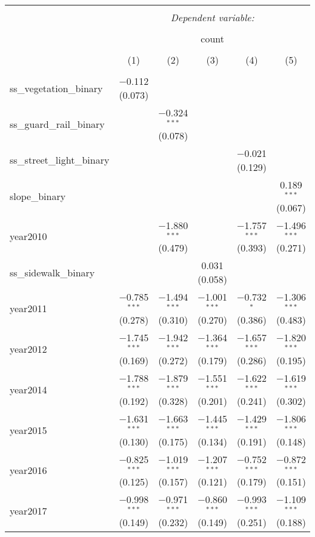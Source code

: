 
\begin{table}[!htbp] \centering 
  \caption{} 
  \label{} 
\small 
\begin{tabular}{@{\extracolsep{1pt}}lccccc} 
\\[-1.8ex]\hline 
\hline \\[-1.8ex] 
 & \multicolumn{5}{c}{\textit{Dependent variable:}} \\ 
\cline{2-6} 
\\[-1.8ex] & \multicolumn{5}{c}{count} \\ 
\\[-1.8ex] & (1) & (2) & (3) & (4) & (5)\\ 
\hline \\[-1.8ex] 
 ss\_vegetation\_binary & $-$0.112 (0.073) &  &  &  &  \\ 
  ss\_guard\_rail\_binary &  & $-$0.324$^{***}$ (0.078) &  &  &  \\ 
  ss\_street\_light\_binary &  &  &  & $-$0.021 (0.129) &  \\ 
  slope\_binary &  &  &  &  & 0.189$^{***}$ (0.067) \\ 
  year2010 &  & $-$1.880$^{***}$ (0.479) &  & $-$1.757$^{***}$ (0.393) & $-$1.496$^{***}$ (0.271) \\ 
  ss\_sidewalk\_binary &  &  & 0.031 (0.058) &  &  \\ 
  year2011 & $-$0.785$^{***}$ (0.278) & $-$1.494$^{***}$ (0.310) & $-$1.001$^{***}$ (0.270) & $-$0.732$^{*}$ (0.386) & $-$1.306$^{***}$ (0.483) \\ 
  year2012 & $-$1.745$^{***}$ (0.169) & $-$1.942$^{***}$ (0.272) & $-$1.364$^{***}$ (0.179) & $-$1.657$^{***}$ (0.286) & $-$1.820$^{***}$ (0.195) \\ 
  year2014 & $-$1.788$^{***}$ (0.192) & $-$1.879$^{***}$ (0.328) & $-$1.551$^{***}$ (0.201) & $-$1.622$^{***}$ (0.241) & $-$1.619$^{***}$ (0.302) \\ 
  year2015 & $-$1.631$^{***}$ (0.130) & $-$1.663$^{***}$ (0.175) & $-$1.445$^{***}$ (0.134) & $-$1.429$^{***}$ (0.191) & $-$1.806$^{***}$ (0.148) \\ 
  year2016 & $-$0.825$^{***}$ (0.125) & $-$1.019$^{***}$ (0.157) & $-$1.207$^{***}$ (0.121) & $-$0.752$^{***}$ (0.179) & $-$0.872$^{***}$ (0.151) \\ 
  year2017 & $-$0.998$^{***}$ (0.149) & $-$0.971$^{***}$ (0.232) & $-$0.860$^{***}$ (0.149) & $-$0.993$^{***}$ (0.251) & $-$1.109$^{***}$ (0.188) \\ 

\end{tabular}
\end{table}

